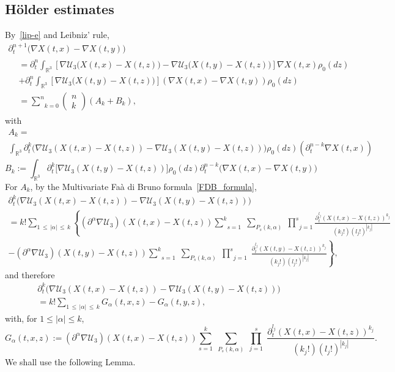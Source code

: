 \documentclass[10pt]{amsart}
\theoremstyle{definition}\newtheorem{defi}[theo]{Definition}\newtheorem{rema}[theo]{Remark}\newtheorem{exam}[theo]{Example}\newtheorem{exem}[theo]{Example}\newtheorem{nota}[theo]{Notation}
\newcommand{\R}{\mathbb{R}}
\newcommand{\clU}{\mathcal{U}}
\renewcommand{\leq}{\leqslant}
\begin{document}
\subsection{H\"older estimates}
By~\eqref{lip-e} and Leibniz' rule,
\begin{multline*}
\partial_t^{n+1}\big(\nabla X(t,x)-\nabla X(t,y)\big)
\\
\begin{aligned}
&= \partial_t^n \int_{\R^3} \left[\nabla \clU_3\big(X(t,x)-X(t,z)\big)-\nabla \clU_3\big(X(t,y)-X(t,z)\big) \right]\nabla X(t,x) \rho_0(dz)\\
&+ \partial_t^n \int_{\R^3} \left[\nabla \clU_3\big(X(t,y)-X(t,z)\big) \right] \left(\nabla X(t,x)-\nabla X(t,y) \right) \rho_0(dz)\\
&=\underset{k=0}{\overset{n}{\sum}}
\begin{pmatrix}
n\\ k
\end{pmatrix} (A_k+ B_k),
\end{aligned}
\end{multline*}
with
\begin{multline*}
A_k =\\ \int_{\R^3} \partial_t^k \big(\nabla \clU_3(X(t,x)-X(t,z))-\nabla \clU_3(X(t,y)-X(t,z)) \big)\rho_0(dz) \left(\partial_t^{n-k}\nabla X(t,x)\right)
\end{multline*}
\[
B_k :=\int_{\R^3} \partial_t^k \big[\nabla \clU_3(X(t,y)-X(t,z)) \big] \rho_0(dz) \partial_t^{n-k}\big(\nabla X(t,x)-\nabla X(t,y) \big)
\]
For $A_k$, by the Multivariate Faà di Bruno formula~\eqref{FDB_formula},
\begin{multline*}
\partial_t^k \big(\nabla \clU_3(X(t,x)-X(t,z))-\nabla \clU_3(X(t,y)-X(t,z)) \big)\\
=k! \underset{1\,\leq\,|\alpha|\,\leq\,k}{\sum} \left\{ \left(\partial^\alpha \nabla \clU_3 \right)(X(t,x)-X(t,z)) \underset{s=1}{\overset{k}{\sum}}\;\underset{P_s(k,\alpha)}{\sum}\;\underset{j=1}{\overset{s}{\prod}}\frac{\partial_t^{l_j} (X(t,x)-X(t,z))^{k_j}}{\left(k_j!\right) \left(l_j!\right)^{\left|k_j\right|}}\right.\\
\left. - \left(\partial^\alpha \nabla \clU_3 \right)(X(t,y)-X(t,z)) \underset{s=1}{\overset{k}{\sum}}\;\underset{P_s(k,\alpha)}{\sum}\;\underset{j=1}{\overset{s}{\prod}}\;\frac{\partial_t^{l_j} (X(t,y)-X(t,z))^{k_j}}{\left(k_j!\right) \left(l_j!\right)^{\left|k_j\right|}} \right\},
\end{multline*}
and therefore
\begin{multline}\label{tard}
\partial_t^k \big(\nabla \clU_3(X(t,x)-X(t,z))-\nabla \clU_3(X(t,y)-X(t,z)) \big)  \\
= k! \underset{1\,\leq\,|\alpha|\,\leq\,k}{\sum} G_\alpha(t,x,z)-G_\alpha(t,y,z),
\end{multline}
with, for $1\leq |\alpha|\leq k$,
\[
G_\alpha(t,x,z):=\left(\partial^\alpha \nabla \clU_3 \right)(X(t,x)-X(t,z)) \underset{s=1}{\overset{k}{\sum}}\;\underset{P_s(k,\alpha)}{\sum}\;\underset{j=1}{\overset{s}{\prod}}\;\frac{\partial_t^{l_j} (X(t,x)-X(t,z))^{k_j}}{\left(k_j!\right) \left(l_j!\right)^{\left|k_j\right|}}.
\]
We shall use the following Lemma.
\end{document}
